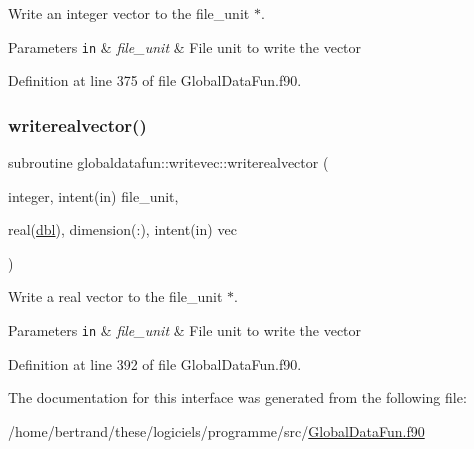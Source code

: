 Write an integer vector to the file\+\_\+unit $\ast$. 


\begin{DoxyParams}[1]{Parameters}
\mbox{\tt in}  & {\em file\+\_\+unit} & File unit to write the vector \\
\hline
\end{DoxyParams}


Definition at line 375 of file Global\+Data\+Fun.\+f90.

\mbox{\label{interfaceglobaldatafun_1_1writevec_a64fd9ea2d0b1776a2844c65a2e7ffac9}} 
\subsubsection{\texorpdfstring{writerealvector()}{writerealvector()}}
{\footnotesize\ttfamily subroutine globaldatafun\+::writevec\+::writerealvector (\begin{DoxyParamCaption}\item[{integer, intent(in)}]{file\+\_\+unit,  }\item[{real(\hyperlink{namespaceglobaldatafun_a5008801201dd34f2af8eae07756befb4}{dbl}), dimension(\+:), intent(in)}]{vec }\end{DoxyParamCaption})\hspace{0.3cm}{\ttfamily [private]}}



Write a real vector to the file\+\_\+unit $\ast$. 


\begin{DoxyParams}[1]{Parameters}
\mbox{\tt in}  & {\em file\+\_\+unit} & File unit to write the vector \\
\hline
\end{DoxyParams}


Definition at line 392 of file Global\+Data\+Fun.\+f90.



The documentation for this interface was generated from the following file\+:\begin{DoxyCompactItemize}
\item 
/home/bertrand/these/logiciels/programme/src/\hyperlink{_global_data_fun_8f90}{Global\+Data\+Fun.\+f90}\end{DoxyCompactItemize}
